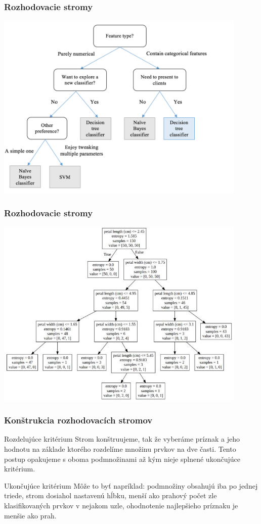 \documentclass{beamer}
\begin{document}
\begin{frame}
\frametitle{Rozhodovacie stromy}
\includegraphics[width=0.9\textwidth]{metatree.png}
\end{frame}

\begin{frame}
\frametitle{Rozhodovacie stromy}
\includegraphics[width=0.9\textwidth]{bettertree.jpg}
\end{frame}


\begin{frame}
\frametitle{Konštrukcia rozhodovacích stromov}

\begin{block}{Rozdelujúce kritérium}
Strom konštruujeme, tak že vyberáme príznak a jeho hodnotu na základe ktorého rozdelíme množinu prvkov na dve časti. Tento postup opakujeme s oboma podmnožinami až kým nieje splnené ukončujúce kritérium.
\end{block}

\begin{block}{Ukončujúce kritérium}
Môže to byť napríklad: podmnožiny obsahujú iba po jednej triede, strom dosiahol nastavenú hĺbku, menší ako prahový počet zle klasifikovaných prvkov v nejakom uzle, ohodnotenie najlepšieho príznaku je menšie ako prah.
\end{block}
\end{frame}
\end{document}
